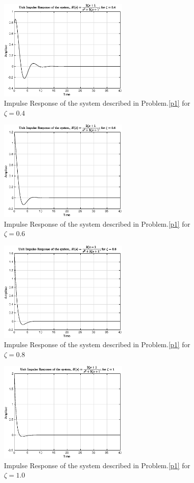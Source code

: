 \documentclass[12pt,conference,a4paper,twocolumn]{IEEEtran}
\begin{document}
\begin{figure}[h!]
\centering
\includegraphics[width=2.5in]{z.4.eps}
\caption{Impulse Response of the system described in Problem.\ref{p1} for $\zeta=0.4$}
\end{figure}

\begin{figure}[h!]
\centering
\includegraphics[width=2.5in]{z.6.eps}
\caption{Impulse Response of the system described in Problem.\ref{p1} for $\zeta=0.6$}
\end{figure}

\begin{figure}[h!]
\centering
\includegraphics[width=2.5in]{z.8.eps}
\caption{Impulse Response of the system described in Problem.\ref{p1} for $\zeta=0.8$}
\end{figure}

\begin{figure}[h!]
\centering
\includegraphics[width=2.5in]{z1.0.eps}
\caption{Impulse Response of the system described in Problem.\ref{p1} for $\zeta=1.0$}
\end{figure}
\end{document}
